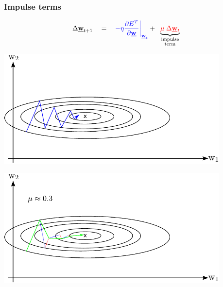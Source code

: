 \begin{frame} \frametitle{Impulse terms}
		\begin{equation*}
			\Delta \vec{w}_{t + 1} \quad=\quad 
			{\color{blue} -{\eta} \frac{\partial E^T}{
				\partial \vec{w}} \bigg|_{\vec{w}_t} } + \;\;
				\underbrace{{\color{red} \mu \; \Delta \vec{w}_t} }_{
					\substack{\text{impulse} \\
						\text{term}}}
		\end{equation*}
	\vspace{-2cm}
		\begin{center} 
			\includegraphics[height=6cm]{img/section1_fig23_clean.pdf} \\
		\end{center}
		\begin{center} 
			\includegraphics[height=6cm]{img/section1_fig24_clean.pdf}  \\
		\end{center}
\end{frame}

